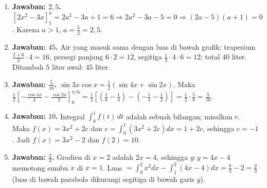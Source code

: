 \documentclass[a4paper,11pt]{article}
\newcounter{no}
\begin{document}
\par{}\par\vspace{0.2em}
\small\begin{enumerate}[leftmargin=2em,itemsep=2pt,topsep=2pt]
\item[\textbf{1.}] \textbf{Jawaban: $2{,}5$.} $\left[2x^2-3x\right]_1^a=2a^2-3a+1=6\Rightarrow2a^2-3a-5=0\Rightarrow(2a-5)(a+1)=0$. Karena $a>1$, $a=\frac52=2{,}5$.
\item[\textbf{2.}] \textbf{Jawaban: $45$.} Air yang masuk sama dengan luas di bawah grafik: trapesium $\frac{2+6}{2}\cdot4=16$, persegi panjang $6\cdot2=12$, segitiga $\frac12\cdot4\cdot6=12$; total $40$ liter. Ditambah $5$ liter awal: $45$ liter.
\item[\textbf{3.}] \textbf{Jawaban: $\frac5{16}$.} $\sin3x\cos x=\frac12(\sin4x+\sin2x)$. Maka $\frac12\left[-\frac{\cos4x}{4}-\frac{\cos2x}{2}\right]_0^{\pi/6}=\frac12\left[\left(\frac18-\frac14\right)-\left(-\frac14-\frac12\right)\right]=\frac12\cdot\frac58=\frac5{16}$.
\item[\textbf{4.}] \textbf{Jawaban: $10$.} Integral $\int_0^1f(t)\,dt$ adalah sebuah bilangan; misalkan $c$. Maka $f(x)=3x^2+2c$ dan $c=\int_0^1(3x^2+2c)dx=1+2c$, sehingga $c=-1$. Jadi $f(x)=3x^2-2$ dan $f(2)=10$.
\item[\textbf{5.}] \textbf{Jawaban: $\frac23$.} Gradien di $x=2$ adalah $2x=4$, sehingga $g:y=4x-4$ memotong sumbu $x$ di $x=1$. Luas $=\int_0^2x^2dx-\int_1^2(4x-4)dx=\frac83-2=\frac23$ (luas di bawah parabola dikurangi segitiga di bawah garis $g$).
\end{enumerate}
\par{}\par\vspace{0.2em}
\end{document}
